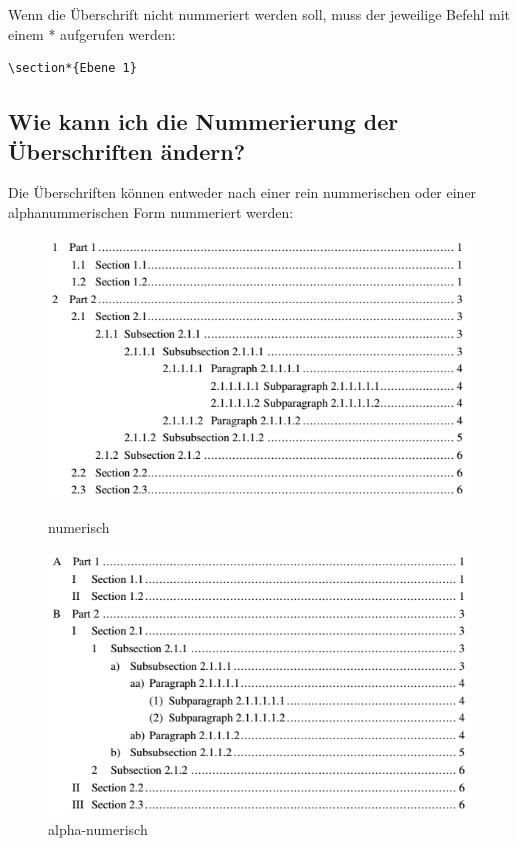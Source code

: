 \documentclass[12pt]{article}
\begin{document}
\noindent Wenn die Überschrift nicht nummeriert werden soll, muss der jeweilige Befehl mit einem * aufgerufen werden:
\begin{verbatim}
\section*{Ebene 1}
\end{verbatim}

\subsection{Wie kann ich die Nummerierung der Überschriften ändern?}
Die Überschriften können entweder nach einer rein nummerischen oder einer alphanummerischen Form nummeriert werden:
\begin{figure}[ht]
\centering
\begin{minipage}[t]{0.49\linewidth}
    \centering
    \includegraphics[width=\linewidth]{dokuImages/toc_num.png}
    \caption{numerisch}
\end{minipage}%
\hfill
\begin{minipage}[t]{0.49\linewidth}
    \centering
    \includegraphics[width=\linewidth]{dokuImages/toc_alphanum.png}
    \caption{alpha-numerisch}
\end{minipage}
\end{figure}
\end{document}
